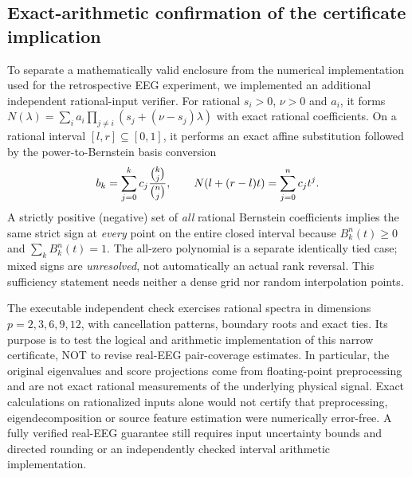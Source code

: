 \subsection{Exact-arithmetic confirmation of the certificate implication}
\label{sec:p4-exact-rational}
To separate a mathematically valid enclosure from the numerical
implementation used for the retrospective EEG experiment, we
implemented an additional independent rational-input verifier.
For rational $s_i>0$, $\nu>0$ and $a_i$, it forms
$N(\lambda)=\sum_i a_i\prod_{j\ne i}
(s_j+(\nu-s_j)\lambda)$ with exact rational coefficients.
On a rational interval $[l,r]\subseteq[0,1]$, it performs
an exact affine substitution followed by the power-to-Bernstein
basis conversion
\[
 b_k=\sum_{j=0}^{k}c_j
 {\binom{k}{j}\over\binom{n}{j}},\qquad
 N(l+(r-l)t)=\sum_{j=0}^{n}c_jt^j.
\]
A strictly positive (negative) set of \emph{all} rational
Bernstein coefficients implies the same strict sign at
\emph{every} point on the entire closed interval because
$B_k^n(t)\ge0$ and $\sum_kB_k^n(t)=1$.
The all-zero polynomial is a separate identically tied case;
mixed signs are \emph{unresolved}, not automatically an actual
rank reversal. This sufficiency statement needs neither a
dense grid nor random interpolation points.

The executable independent check exercises rational spectra in
dimensions $p=2,3,6,9,12$, with cancellation patterns,
boundary roots and exact ties. Its purpose is to test the
logical and arithmetic implementation of this narrow certificate,
NOT to revise real-EEG pair-coverage estimates. In particular,
the original eigenvalues and score projections come from
floating-point preprocessing and are not exact rational
measurements of the underlying physical signal. Exact
calculations on rationalized inputs alone would not certify
that preprocessing, eigendecomposition or source feature
estimation were numerically error-free. A fully verified
real-EEG guarantee still requires input uncertainty bounds
and directed rounding or an independently checked interval
arithmetic implementation.
